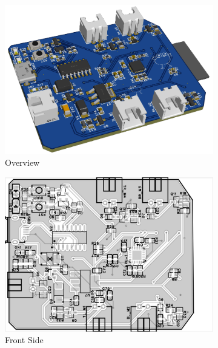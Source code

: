 \begin{figure}[H]
    \centering
    \begin{subfigure}[b]{0.45\linewidth}
        \centering
        \includegraphics[width=\linewidth]{img/proto-pcb2.png}
        \caption{Overview}
        \label{fig:pcb2-overview}
    \end{subfigure}
    \vfill
    \begin{subfigure}[b]{0.4\linewidth}
        \centering
        \includegraphics[width=\linewidth]{img/PCBit2_front.png}
        \caption{Front Side}
        \label{fig:pcb2-front}
    \end{subfigure}
    \hfill 
    \begin{subfigure}[b]{0.4\linewidth}
        \centering

\end{subfigure}
\end{figure}
